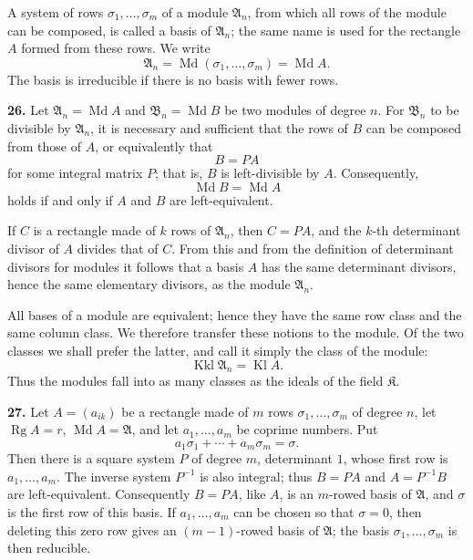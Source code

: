 \documentclass[11pt,a4paper]{article}
\newcommand{\K}{\mathfrak K}
\newcommand{\Kl}{\operatorname{Kl}}
\newcommand{\Kkl}{\operatorname{Kkl}}
\begin{document}
A system of rows \(\sigma_1,\ldots,\sigma_m\) of a module \(\mathfrak A_n\), from which all rows of the module can be composed, is called a basis of \(\mathfrak A_n\); the same name is used for the rectangle \(A\) formed from these rows. We write
\[
 \mathfrak A_n=\operatorname{Md}(\sigma_1,\ldots,\sigma_m)=\operatorname{Md} A.
\]
The basis is irreducible if there is no basis with fewer rows.

\textbf{26.} Let \(\mathfrak A_n=\operatorname{Md}A\) and \(\mathfrak B_n=\operatorname{Md}B\) be two modules of degree \(n\). For \(\mathfrak B_n\) to be divisible by \(\mathfrak A_n\), it is necessary and sufficient that the rows of \(B\) can be composed from those of \(A\), or equivalently that
\[
 B=PA
\]
for some integral matrix \(P\); that is, \(B\) is left-divisible by \(A\). Consequently,
\[
 \operatorname{Md}B=\operatorname{Md}A
\]
holds if and only if \(A\) and \(B\) are left-equivalent.

If \(C\) is a rectangle made of \(k\) rows of \(\mathfrak A_n\), then \(C=PA\), and the \(k\)-th determinant divisor of \(A\) divides that of \(C\). From this and from the definition of determinant divisors for modules it follows that a basis \(A\) has the same determinant divisors, hence the same elementary divisors, as the module \(\mathfrak A_n\).

All bases of a module are equivalent; hence they have the same row class and the same column class. We therefore transfer these notions to the module. Of the two classes we shall prefer the latter, and call it simply the class of the module:
\[
 \Kkl\mathfrak A_n=\Kl A.
\]
Thus the modules fall into as many classes as the ideals of the field \(\K\).

\textbf{27.} Let \(A=(a_{ik})\) be a rectangle made of \(m\) rows \(\sigma_1,\ldots,\sigma_m\) of degree \(n\), let \(\operatorname{Rg}A=r\), \(\operatorname{Md}A=\mathfrak A\), and let \(a_1,\ldots,a_m\) be coprime numbers. Put
\[
 a_1\sigma_1+\cdots+a_m\sigma_m=\sigma. \tag{28}
\]
Then there is a square system \(P\) of degree \(m\), determinant \(1\), whose first row is \(a_1,\ldots,a_m\). The inverse system \(P^{-1}\) is also integral; thus \(B=PA\) and \(A=P^{-1}B\) are left-equivalent. Consequently \(B=PA\), like \(A\), is an \(m\)-rowed basis of \(\mathfrak A\), and \(\sigma\) is the first row of this basis. If \(a_1,\ldots,a_m\) can be chosen so that \(\sigma=0\), then deleting this zero row gives an \((m-1)\)-rowed basis of \(\mathfrak A\); the basis \(\sigma_1,\ldots,\sigma_m\) is then reducible.
\end{document}
